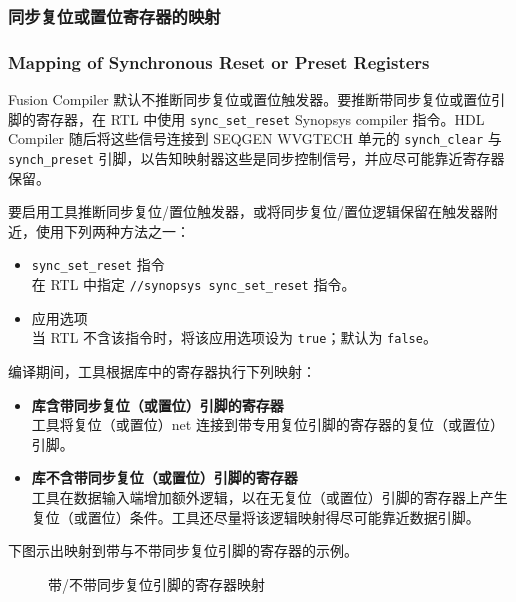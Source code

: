 \subsubsection{同步复位或置位寄存器的映射}
\subsubsection*{Mapping of Synchronous Reset or Preset Registers}

Fusion Compiler 默认不推断同步复位或置位触发器。要推断带同步复位或置位引脚的寄存器，在 RTL 中使用 \texttt{sync\_set\_reset} Synopsys compiler 指令。HDL Compiler 随后将这些信号连接到 SEQGEN WVGTECH 单元的 \texttt{synch\_clear} 与 \texttt{synch\_preset} 引脚，以告知映射器这些是同步控制信号，并应尽可能靠近寄存器保留。

要启用工具推断同步复位/置位触发器，或将同步复位/置位逻辑保留在触发器附近，使用下列两种方法之一：
\begin{itemize}
  \item \texttt{sync\_set\_reset} 指令\\
    在 RTL 中指定 \texttt{//synopsys sync\_set\_reset} 指令。
  \item {} 应用选项\\
    当 RTL 不含该指令时，将该应用选项设为 \texttt{true}；默认为 \texttt{false}。
\end{itemize}

编译期间，工具根据库中的寄存器执行下列映射：
\begin{itemize}
  \item \textbf{库含带同步复位（或置位）引脚的寄存器}\\
    工具将复位（或置位）net 连接到带专用复位引脚的寄存器的复位（或置位）引脚。
  \item \textbf{库不含带同步复位（或置位）引脚的寄存器}\\
    工具在数据输入端增加额外逻辑，以在无复位（或置位）引脚的寄存器上产生复位（或置位）条件。工具还尽量将该逻辑映射得尽可能靠近数据引脚。
\end{itemize}

下图示出映射到带与不带同步复位引脚的寄存器的示例。

\begin{figure}[htbp]
\centering
{}
\caption{带/不带同步复位引脚的寄存器映射}
\label{fig:sync-reset-map}
\end{figure}

